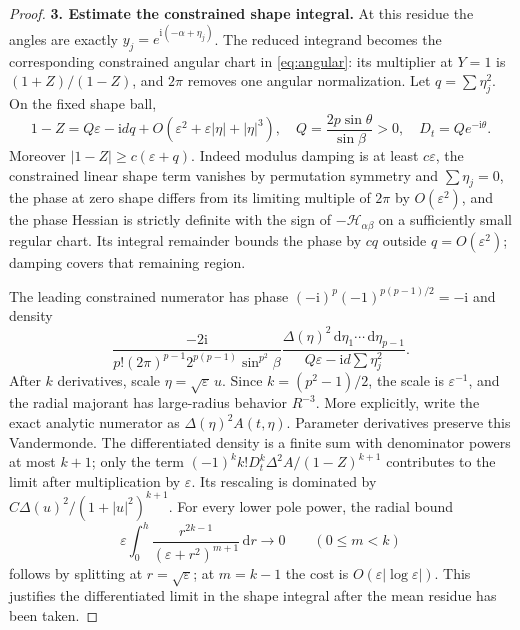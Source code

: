 \documentclass[11pt]{article}
\numberwithin{equation}{section}
\theoremstyle{definition}
\newcommand{\dd}{\,\mathrm d}
\newcommand{\ii}{\mathrm i}
\newcommand{\eps}{\varepsilon}
\newcommand{\Hpair}{\mathcal H_{\alpha\beta}}
\begin{document}
\begin{proof}
\par\smallskip\noindent\textbf{3. Estimate the constrained shape integral.} At this residue the angles are exactly $y_j=e^{\ii(-\alpha+\eta_j)}$.
The reduced integrand becomes the corresponding constrained
angular chart in \eqref{eq:angular}: its multiplier at $Y=1$ is
$(1+Z)/(1-Z)$, and $2\pi$ removes one angular normalization.
Let $q=\sum\eta_j^2$. On the fixed shape ball,
\begin{equation}
 1-Z=Q\eps-\ii d q+
 O(\eps^2+\eps|\eta|+|\eta|^3),\quad
 Q=\frac{2p\sin\theta}{\sin\beta}>0,
 \quad D_t=Qe^{-\ii\theta}.
 \label{eq:localdenom}
\end{equation}
Moreover $|1-Z|\ge c(\eps+q)$. Indeed modulus damping is at
least $c\eps$, the constrained linear shape term vanishes by
permutation symmetry and $\sum\eta_j=0$, the phase at zero shape
differs from its limiting multiple of $2\pi$ by $O(\eps^2)$,
and the phase Hessian is
strictly definite with the sign of $-\Hpair$ on a sufficiently
small regular chart. Its integral remainder bounds the phase by
$cq$ outside $q=O(\eps^2)$; damping covers that remaining region.

The leading constrained numerator has phase
$(-\ii)^p(-1)^{p(p-1)/2}=-\ii$ and density
\[
 \frac{-2\ii}{p!(2\pi)^{p-1}2^{p(p-1)}\sin^{p^2}\beta}
 \frac{\Delta(\eta)^2\dd\eta_1\cdots\dd\eta_{p-1}}
 {Q\eps-\ii d\sum\eta_j^2}.
\]
After $k$ derivatives, scale $\eta=\sqrt\eps\,u$. Since
$k=(p^2-1)/2$, the scale is $\eps^{-1}$, and the radial
majorant has large-radius behavior $R^{-3}$. More explicitly,
write the exact analytic numerator as $\Delta(\eta)^2A(t,\eta)$.
Parameter derivatives preserve this Vandermonde. The differentiated
density is a finite sum with denominator powers at most $k+1$;
only the term $(-1)^k k!D_t^k\Delta^2A/(1-Z)^{k+1}$ contributes
to the limit after multiplication by $\eps$. Its rescaling is
dominated by $C\Delta(u)^2/(1+|u|^2)^{k+1}$.
For every lower pole power, the radial bound
\[
 \eps\int_0^h\frac{r^{2k-1}}{(\eps+r^2)^{m+1}}\dd r
 \longrightarrow0\qquad(0\le m<k)
\]
follows by splitting at $r=\sqrt\eps$; at $m=k-1$ the cost is
$O(\eps|\log\eps|)$. This justifies the differentiated limit
in the shape integral after the mean residue has been taken.


\end{proof}
\end{document}
